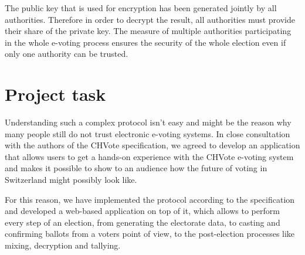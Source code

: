 The public key that is used for encryption has been generated jointly by all authorities. Therefore in order to decrypt the result, all authorities must provide their share of the private key. The measure of multiple authorities participating in the whole e-voting process ensures the security of the whole election even if only one authority can be trusted.


\section{Project task}

Understanding such a complex protocol isn't easy and might be the reason why many people still do not trust electronic e-voting systems. In close consultation with the authors of the CHVote specification, we agreed to develop an application that allows users to get a hands-on experience with the CHVote e-voting system and makes it possible to show to an audience how the future of voting in Switzerland might possibly look like.

For this reason, we have implemented the protocol according to the specification and developed a web-based application on top of it, which allows to perform every step of an election, from generating the electorate data, to casting and confirming ballots from a voters point of view, to the post-election processes like mixing, decryption and tallying.
